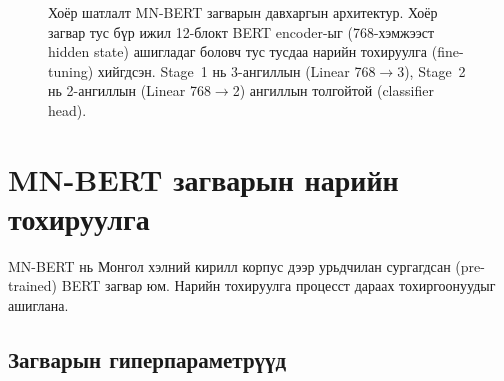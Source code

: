 \begin{figure}[H]
{%
}
\caption{Хоёр шатлалт MN-BERT загварын давхаргын архитектур. Хоёр загвар тус бүр
  ижил 12-блокт BERT encoder-ыг (768-хэмжээст hidden state) ашигладаг боловч
  тус тусдаа нарийн тохируулга (fine-tuning) хийгдсэн.
  Stage~1 нь 3-ангиллын (Linear 768$\to$3),
  Stage~2 нь 2-ангиллын (Linear 768$\to$2) ангиллын толгойтой (classifier head).}
\label{fig:two-stage-arch}
\end{figure}

\section{MN-BERT загварын нарийн тохируулга}

MN-BERT нь Монгол хэлний кирилл корпус дээр урьдчилан сургагдсан (pre-trained)
BERT загвар юм. Нарийн тохируулга процесст дараах тохиргоонуудыг ашиглана.

\subsection{Загварын гиперпараметрүүд}

